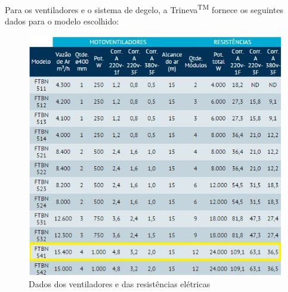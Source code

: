 Para os ventiladores e o sistema de degelo, a Trineva\textsuperscript{TM} fornece os seguintes dados para o modelo escolhido:
\begin{figure}[!htbp]
	 \centering
	  \includegraphics[scale=1]{editaveis/figuras/dados_ventiladores}
	  \caption[Dados dos ventiladores]{Dados dos ventiladores e das resistências elétricas \footnotemark}
	  \label{vazao_evaporador}
	\end{figure}	   
	\FloatBarrier